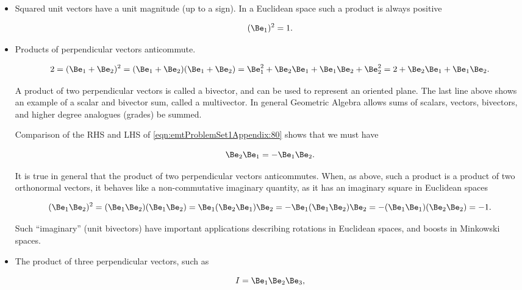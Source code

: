 \begin{itemize}
\item Squared unit vectors have a unit magnitude (up to a sign).  In a Euclidean space such a product is always positive

\begin{dmath}\label{eqn:emtProblemSet1Appendix:60}
(\Be_1)^2 = 1.
\end{dmath}

\item Products of perpendicular vectors anticommute.

\begin{dmath}\label{eqn:emtProblemSet1Appendix:80}
2 
=
(\Be_1 + \Be_2)^2 
= (\Be_1 + \Be_2)(\Be_1 + \Be_2)
= \Be_1^2 + \Be_2 \Be_1 + \Be_1 \Be_2 + \Be_2^2
= 2 + \Be_2 \Be_1 + \Be_1 \Be_2.
\end{dmath}

A product of two perpendicular vectors is called a bivector, and can be used to represent an oriented plane.  The last line above shows an example of a scalar and bivector sum, called a multivector.  In general Geometric Algebra allows sums of scalars, vectors, bivectors, and higher degree analogues (grades) be summed.

Comparison of the RHS and LHS of \cref{eqn:emtProblemSet1Appendix:80} shows that we must have

\begin{dmath}\label{eqn:emtProblemSet1Appendix:100}
\Be_2 \Be_1 = -\Be_1 \Be_2.
\end{dmath}

It is true in general that the product of two perpendicular vectors anticommutes.  When, as above, such a product is a product of
two orthonormal vectors, it behaves like a non-commutative imaginary quantity, as it has an imaginary square in Euclidean spaces

\begin{dmath}\label{eqn:emtProblemSet1Appendix:120}
(\Be_1 \Be_2)^2
=
(\Be_1 \Be_2)
(\Be_1 \Be_2)
=
\Be_1 (\Be_2
\Be_1) \Be_2
=
-\Be_1 (\Be_1
\Be_2) \Be_2
=
-(\Be_1 \Be_1)
(\Be_2 \Be_2)
=-1.
\end{dmath}

Such ``imaginary'' (unit bivectors) have important applications describing rotations in Euclidean spaces, and boosts in Minkowski spaces.

\item
The product of three perpendicular vectors, such as

\begin{dmath}\label{eqn:emtProblemSet1Appendix:140}
I = \Be_1 \Be_2 \Be_3,
\end{dmath}


\end{itemize}
